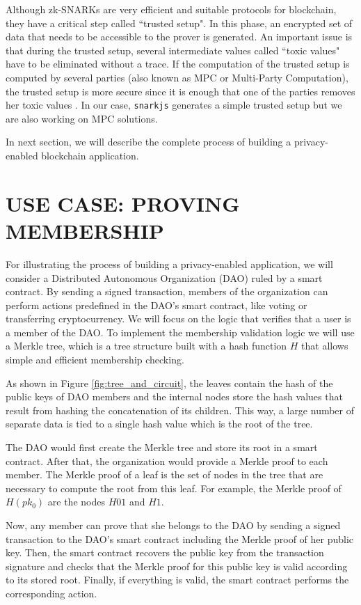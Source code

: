 \documentclass{IEEEcsmag}
\begin{document}
Although zk-SNARKs are very efficient and suitable protocols for blockchain, they have
a critical step called ``trusted setup". 
In this phase, an encrypted set of data that needs 
to be accessible to the prover is generated. 
An important issue is that during the trusted setup, several 
intermediate values 
called ``toxic values" have to be eliminated without a trace.
If the computation of the trusted setup is computed 
by several parties (also known 
as MPC or Multi-Party Computation), the trusted setup is 
more secure since it is enough that one of 
the parties removes her toxic values \cite{zcash}.
In our case, \texttt{snarkjs} generates a simple trusted setup but we are also working on MPC solutions.

In next section, we will describe  the complete process 
of building a privacy-enabled blockchain application.

\section{USE CASE: PROVING MEMBERSHIP}

For illustrating the process of building a privacy-enabled 
application, we will consider a Distributed Autonomous 
Organization (DAO) ruled by a smart contract.
By sending a signed transaction, members of the organization can perform 
actions predefined in the DAO's smart contract, like voting 
or transferring cryptocurrency. 
We will focus on the logic that verifies that a user is a member of the DAO. 
To implement the membership validation logic we will use a Merkle tree, 
which is a tree structure built with a hash function  $H$
that allows simple and efficient membership checking.

As shown in Figure \ref{fig:tree_and_circuit}, the leaves contain
the hash of the public keys of DAO members and the internal nodes
store the hash values that result from hashing 
the concatenation of its children. 
This way, a large number of separate data is tied to a single hash value 
which is the root of the tree.

The DAO would first create the Merkle tree and store 
its root in a smart contract. 
After that, the organization would provide a Merkle proof to each member.
The Merkle proof of a leaf is the set of nodes in the tree that are necessary 
to compute the root from this leaf.
For example, the Merkle proof of $H(pk_0)$ are the nodes $H01$ and $H1$.

Now, any member can prove that she belongs to the DAO by
sending a signed transaction to the DAO's smart contract
including the Merkle proof of her public key.
Then, the smart contract recovers the public key from the transaction signature and
checks that the Merkle proof for this public key is valid according 
to its stored root.
Finally, if everything is valid, the smart contract performs the 
corresponding action.
\end{document}
